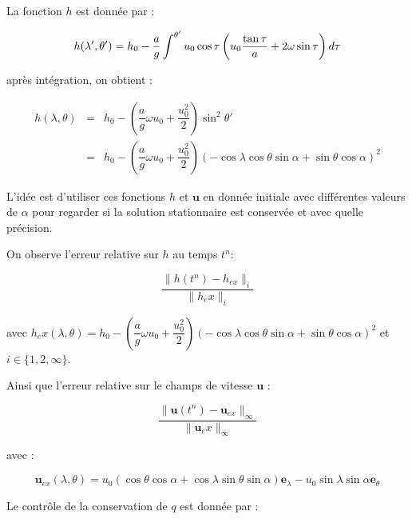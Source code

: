 La fonction $h$ est donnée par :

\begin{equation}
h(\lambda', \theta') = h_0 - \dfrac{a}{g} \displaystyle\int^{\theta'} u_0 \cos \tau \left( u_0 \dfrac{\tan \tau}{a} + 2 \omega \sin \tau \right) d \tau
\end{equation}

après intégration, on obtient :

\begin{equation}
\begin{array}{rcl}
h(\lambda, \theta) & = & h_0 - \left( \dfrac{a}{g} \omega u_0 + \dfrac{u_0^2}{2} \right) \sin^2 \theta' \\
                   & = & h_0 - \left( \dfrac{a}{g} \omega u_0 + \dfrac{u_0^2}{2} \right) \left( - \cos \lambda \cos \theta \sin \alpha + \sin \theta \cos \alpha \right)^2
\end{array}
\end{equation}

L'idée est d'utiliser ces fonctions $h$ et $\mathbf{u}$ en donnée initiale avec différentes valeurs de $\alpha$ pour regarder si la solution stationnaire est conservée et avec quelle précision.

On observe l'erreur relative sur $h$ au temps $t^n$:

\begin{equation}
\dfrac{\| h(t^n) - h_{ex}\|_i}{\| h_ex \|_i}
\end{equation}

avec $h_ex(\lambda, \theta) = h_0 - \left( \dfrac{a}{g} \omega u_0 + \dfrac{u_0^2}{2} \right) \left( - \cos \lambda \cos \theta \sin \alpha + \sin \theta \cos \alpha \right)^2$ et $i \in \lbrace 1,2,\infty \rbrace$.

Ainsi que l'erreur relative sur le champs de vitesse $\mathbf{u}$ : 

\begin{equation}
\dfrac{\| \mathbf{u}(t^n) - \mathbf{u}_{ex}\|_{\infty}}{\| \mathbf{u}_ex \|_\infty}
\end{equation}

avec :

\begin{equation}
\mathbf{u}_{ex}(\lambda, \theta) = u_0 \left( \cos \theta \cos \alpha + \cos \lambda \sin \theta \sin \alpha \right) \mathbf{e}_{\lambda} - u_0 \sin \lambda \sin \alpha \mathbf{e}_{\theta}
\end{equation}

Le contrôle de la conservation de $q$ est donnée par :

